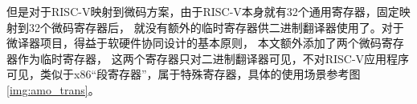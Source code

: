 但是对于RISC-V映射到微码方案，由于RISC-V本身就有32个通用寄存器，固定映射到32个微码寄存器后，
就没有额外的临时寄存器供二进制翻译器使用了。对于微译器项目，得益于软硬件协同设计的基本原则，
本文额外添加了两个微码寄存器作为临时寄存器，
这两个寄存器只对二进制翻译器可见，不对RISC-V应用程序可见，类似于x86“段寄存器”，属于特殊寄存器，具体的使用场景参考图\ref{img:amo_trans}。


